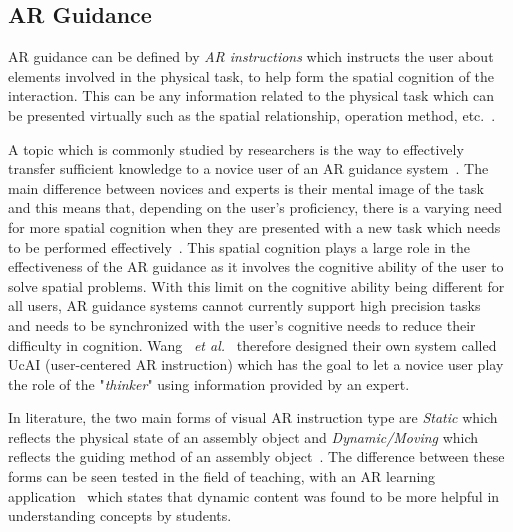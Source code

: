 \subsection{AR Guidance}
\label{ar_guidance}

AR guidance can be defined by \textit{AR instructions} which instructs the user about elements involved in the physical task, to help form the spatial cognition of the interaction. This can be any information related to the physical task which can be presented virtually such as the spatial relationship, operation method, etc.~\cite{wang2021role}.

A topic which is commonly studied by researchers is the way to effectively transfer sufficient knowledge to a novice user of an AR guidance system~\cite{baxter2012human,wang2021role}. The main difference between novices and experts is their mental image of the task~\cite{baxter2012human} and this means that, depending on the user's proficiency, there is a varying need for more spatial cognition when they are presented with a new task which needs to be performed effectively~\cite{wang2021role}. This spatial cognition plays a large role in the effectiveness of the AR guidance as it involves the cognitive ability of the user to solve spatial problems.
With this limit on the cognitive ability being different for all users, AR guidance systems cannot currently support high precision tasks~\cite{wang2021role} and needs to be synchronized with the user's cognitive needs to reduce their difficulty in cognition.
Wang ~\textit{et al.}~\cite{wang2021role} therefore designed their own system called UcAI (user-centered AR instruction) which has the goal to let a novice user play the role of the "\textit{thinker}" using information provided by an expert.

In literature, the two main forms of visual AR instruction type are \textit{Static} which reflects the physical state of an assembly object and \textit{Dynamic/Moving} which reflects the guiding method of an assembly object~\cite{feiner1993knowledge,wang2016multi,wang2022comprehensive,maffei2023dynamic,wang2021role}. 
The difference between these forms can be seen tested in the field of teaching, with an AR learning application~\cite{montoya2016evaluating} which states that dynamic content was found to be more helpful in understanding concepts by students. 

